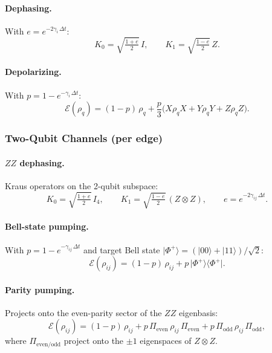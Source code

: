 \documentclass[11pt,a4paper]{article}
\newcommand{\ket}[1]{\lvert #1 \rangle}
\newcommand{\bra}[1]{\langle #1 \rvert}
\begin{document}
\paragraph{Dephasing.}
With $e = e^{-2\gamma_i\,\Delta t}$:
\begin{equation}
  K_0 = \sqrt{\tfrac{1+e}{2}}\,I,
  \qquad
  K_1 = \sqrt{\tfrac{1-e}{2}}\,Z.
\end{equation}

\paragraph{Depolarizing.}
With $p = 1 - e^{-\gamma_i\,\Delta t}$:
\begin{equation}
  \mathcal{E}(\rho_q) = (1-p)\,\rho_q + \frac{p}{3}
  \bigl(X\rho_q X + Y\rho_q Y + Z\rho_q Z\bigr).
\end{equation}

\subsubsection{Two-Qubit Channels (per edge)}

\paragraph{$ZZ$ dephasing.}
Kraus operators on the 2-qubit subspace:
\begin{equation}
  K_0 = \sqrt{\tfrac{1+e}{2}}\,I_4,
  \qquad
  K_1 = \sqrt{\tfrac{1-e}{2}}\,(Z\otimes Z),
  \qquad e = e^{-2\gamma_{ij}\,\Delta t}.
\end{equation}

\paragraph{Bell-state pumping.}
With $p = 1 - e^{-\gamma_{ij}\,\Delta t}$ and target Bell state
$\ket{\Phi^+} = (\ket{00}+\ket{11})/\sqrt{2}$:
\begin{equation}
  \mathcal{E}(\rho_{ij})
  = (1-p)\,\rho_{ij} + p\,\ket{\Phi^+}\bra{\Phi^+}.
\end{equation}

\paragraph{Parity pumping.}
Projects onto the even-parity sector of the $ZZ$ eigenbasis:
\begin{equation}
  \mathcal{E}(\rho_{ij})
  = (1-p)\,\rho_{ij}
  + p\,\Pi_{\mathrm{even}}\,\rho_{ij}\,\Pi_{\mathrm{even}}
  + p\,\Pi_{\mathrm{odd}}\,\rho_{ij}\,\Pi_{\mathrm{odd}},
\end{equation}
where $\Pi_{\mathrm{even/odd}}$ project onto the $\pm1$ eigenspaces
of $Z\otimes Z$.
\end{document}
